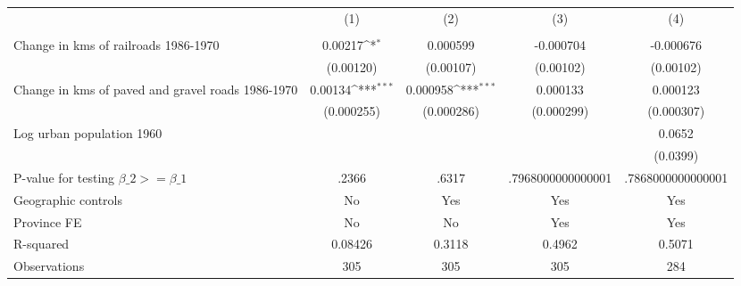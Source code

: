 {
\def\sym#1{\ifmmode^{#1}\else\(^{#1}\)\fi}
\begin{tabular}{l*{4}{c}}
\hline\hline
                &\multicolumn{1}{c}{(1)}&\multicolumn{1}{c}{(2)}&\multicolumn{1}{c}{(3)}&\multicolumn{1}{c}{(4)}\\
                &\multicolumn{1}{c}{}&\multicolumn{1}{c}{}&\multicolumn{1}{c}{}&\multicolumn{1}{c}{}\\
\hline
Change in kms of railroads 1986-1970&  0.00217\sym{*}  & 0.000599         &-0.000704         &-0.000676         \\
                &(0.00120)         &(0.00107)         &(0.00102)         &(0.00102)         \\
[1em]
Change in kms of paved and gravel roads 1986-1970&  0.00134\sym{***}& 0.000958\sym{***}& 0.000133         & 0.000123         \\
                &(0.000255)         &(0.000286)         &(0.000299)         &(0.000307)         \\
[1em]
Log urban population 1960&                  &                  &                  &   0.0652         \\
                &                  &                  &                  & (0.0399)         \\
\hline
P-value for testing $\beta\_{2} >= \beta\_{1}$&    .2366         &    .6317         &.7968000000000001         &.7868000000000001         \\
Geographic controls&       No         &      Yes         &      Yes         &      Yes         \\
Province FE     &       No         &       No         &      Yes         &      Yes         \\
R-squared       &  0.08426         &   0.3118         &   0.4962         &   0.5071         \\
Observations    &      305         &      305         &      305         &      284         \\
\hline\hline
\end{tabular}
}
